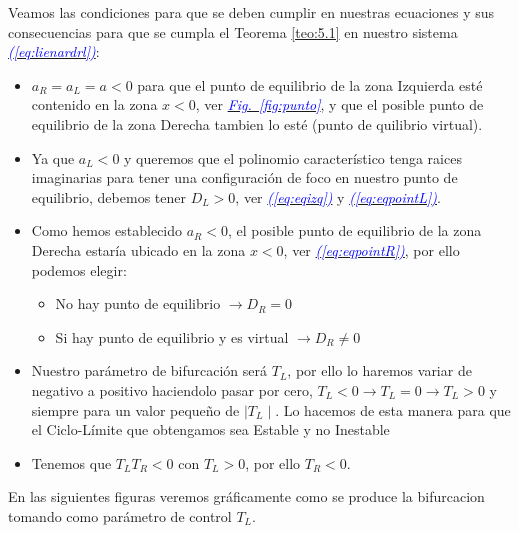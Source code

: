 \documentclass[12pt,a4paper]{report} %
\newcommand{\fref}[1]{\hyperref[#1]{\textcolor{blue}{\textit{Fig.~\ref*{#1}}}}}
\newcommand{\eref}[1]{\hyperref[#1]{\textcolor{blue}{\textit{(\ref*{#1})}}}}
\begin{document}
	Veamos las condiciones para que se deben cumplir en nuestras ecuaciones y sus consecuencias para que se cumpla el Teorema \ref{teo:5.1} en nuestro sistema \eref{eq:lienardrl}:
		\begin{itemize}
			\item $a_R=a_L=a<0$ para que el punto de equilibrio de la zona Izquierda esté contenido en la zona $x<0$, ver \fref{fig:punto}, y que el posible punto de equilibrio de la zona Derecha tambien lo esté (punto de quilibrio virtual).
			\item Ya que $a_L<0$ y queremos que el polinomio característico  tenga raices imaginarias para tener una configuración de foco en nuestro punto de equilibrio, debemos tener $D_L>0$, ver \eref{eq:eqizq} y \eref{eq:eqpointL}.
			\item Como hemos establecido $a_R<0$, el posible punto de equilibrio de la zona Derecha estaría ubicado en la zona $x<0$, ver \eref{eq:eqpointR}, por ello podemos elegir:\begin{itemize}
				\item No hay punto de equilibrio $\rightarrow D_R=0$ 
				\item Si hay punto de equilibrio y es virtual $\rightarrow D_R\neq0$ 
			\end{itemize}

			\item Nuestro parámetro de bifurcación será $T_L$, por ello lo haremos variar de negativo a positivo haciendolo pasar por cero, $T_L<0 \rightarrow T_L=0 \rightarrow T_L>0$ y siempre para un valor pequeño de $\mid T_L \mid$. Lo hacemos de esta manera para que el Ciclo-Límite que obtengamos sea Estable y no Inestable
			\item Tenemos que $T_LT_R<0$ con $T_L>0$, por ello  $T_R<0$.
		\end{itemize}
		
		
	\vspace{0.5cm} En las siguientes figuras veremos gráficamente como se produce la bifurcacion tomando como parámetro de control $T_L$.
		
	\newpage
	
\end{document}
